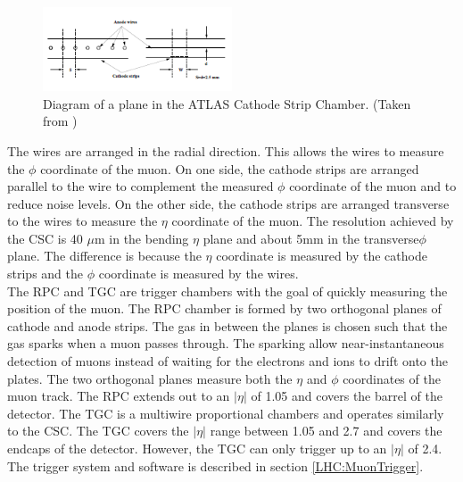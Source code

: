 \begin{figure}[h!]
\centering
\includegraphics[width=0.50\textwidth, angle=0]{figures/DET/ATLAS_CSC.PNG}
\caption{ Diagram of a plane in the ATLAS Cathode Strip Chamber. (Taken from \cite{biblio:JINST}) \label{LHC:fig:ATLASCSC}}
\end{figure}

\indent The wires are arranged in the radial direction. This allows the wires to measure the $\phi$ coordinate of the muon. On one side, the cathode strips are arranged parallel to the wire to complement the measured $\phi$ coordinate of the muon and to reduce noise levels. On the other side, the cathode strips are arranged transverse to the wires to measure the $\eta$ coordinate of the muon. The resolution achieved by the CSC is 40 $\mu$m in the bending $\eta$ plane and about 5mm in the transverse$\phi$ plane. The difference is because the $\eta$ coordinate is measured by the cathode strips and the $\phi$ coordinate is measured by the wires. \cite{biblio:JINST} ~\\
\indent The RPC and TGC are trigger chambers with the goal of quickly measuring the position of the muon. The RPC chamber is formed by two orthogonal planes of cathode and anode strips. The gas in between the planes is chosen such that the gas sparks when a muon passes through. The sparking allow near-instantaneous detection of muons instead of waiting for the electrons and ions to drift onto the plates. The two orthogonal planes measure both the $\eta$ and $\phi$ coordinates of the muon track. The RPC extends out to an $|\eta|$ of 1.05 and covers the barrel of the detector. The TGC is a multiwire proportional chambers and operates similarly to the CSC. The TGC covers the $|\eta|$ range between 1.05 and 2.7 and covers the endcaps of the detector. However, the TGC can only trigger up to an $|\eta|$ of 2.4. The trigger system and software is described in section \ref{LHC:MuonTrigger}. ~\\
